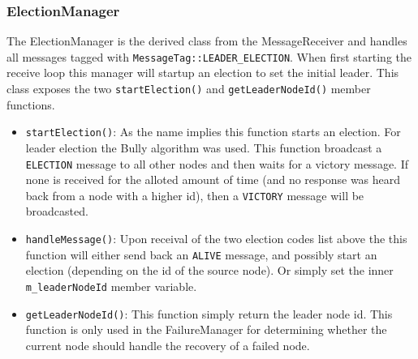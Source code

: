 \documentclass[11pt]{article}
\begin{document}
\subsubsection{ElectionManager}
The ElectionManager is the derived class from the MessageReceiver and handles
all messages tagged with \texttt{MessageTag::LEADER\_ELECTION}. When first
starting the receive loop this manager will startup an election to set the
initial leader. This class exposes the two \texttt{startElection()} and
\texttt{getLeaderNodeId()} member functions.\\
\begin{itemize}
\item \texttt{startElection()}: As the name implies this
function starts an election. For leader election the Bully algorithm was
used. This function broadcast a \texttt{ELECTION} message to all other nodes and
then waits for a victory message. If none is received for the alloted amount of
time (and no response was heard back from a node with a higher id), then a
\texttt{VICTORY} message will be broadcasted.\\
\item \texttt{handleMessage()}: Upon receival of the two election codes list above
the this function will either send back an \texttt{ALIVE} message, and possibly
start an election (depending on the id of the source node). Or simply set the
inner \texttt{m\_leaderNodeId} member variable.\\
\item \texttt{getLeaderNodeId()}: This function simply return the leader node
id. This function is only used in the FailureManager for determining whether the
current node should handle the recovery of a failed node.
\end{itemize}
\end{document}
